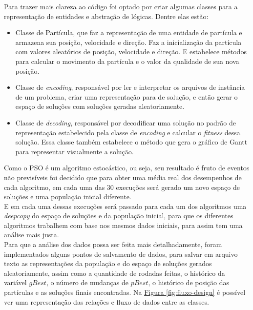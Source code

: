 Para trazer mais clareza ao código foi optado por criar algumas classes para a representação de entidades e abstração de lógicas. Dentre elas estão:
\begin{itemize}
    \item Classe de Partícula, que faz a representação de uma entidade de partícula e armazena sua posição, velocidade e direção. Faz a inicialização da partícula com valores aleatórios de posição, velocidade e direção. E estabelece métodos para calcular o movimento da partícula e o valor da qualidade de sua nova posição.

    \item Classe de \textit{encoding}, responsável por ler e interpretar os arquivos de instância de um problema, criar uma representação para de solução, e então gerar o espaço de soluções com soluções geradas aleatoriamente.

    \item Classe de \textit{decoding}, responsável por decodificar uma solução no padrão de representação estabelecido pela classe de \textit{encoding} e calcular o \textit{fitness} dessa solução. Essa classe também estabelece o método que gera o gráfico de Gantt para representar visualmente a solução.
\end{itemize}

\indent Como o PSO é um algoritmo estocástico, ou seja, seu resultado é fruto de eventos não previsíveis foi decidido que para obter uma média real dos desempenhos de cada algoritmo, em cada uma das 30 execuções será gerado um novo espaço de soluções e uma população inicial diferente.\\
\indent E em cada uma dessas execuções será passado para cada um dos algoritmos uma \textit{deepcopy} do espaço de soluções e da população inicial, para que os diferentes algoritmos trabalhem com base nos mesmos dados iniciais, para assim tem uma análise mais justa.\\
\indent Para que a análise dos dados possa ser feita mais detalhadamente, foram implementados alguns pontos de salvamento de dados, para salvar em arquivo texto as representações da população e do espaço de soluções gerados aleatoriamente, assim como a quantidade de rodadas feitas, o histórico da variável $gBest$, o número de mudanças de $pBest$, o histórico de posição das partículas e as soluções finais encontradas.
%
Na \hyperref[fig:fluxo-design]{Figura \ref{fig:fluxo-design}} é possível ver uma representação das relações e fluxo de dados entre as classes.

